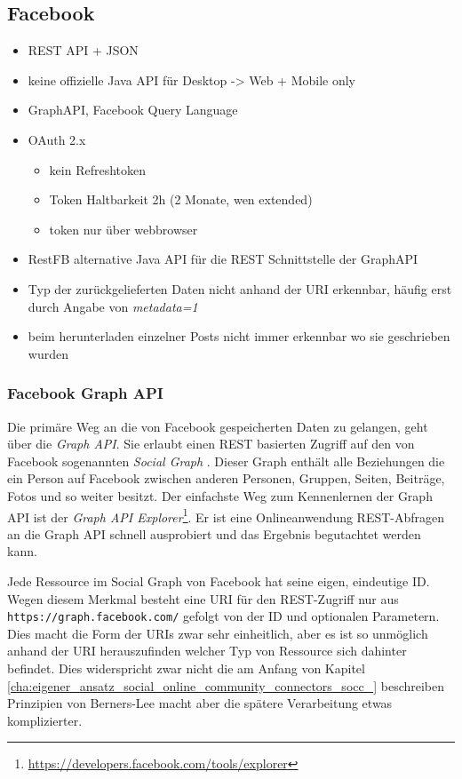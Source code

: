 
\subsection{Facebook} %
\label{sub:facebook_connector}

\begin{itemize}
    \item REST API + JSON
    \item keine offizielle Java API für Desktop -> Web + Mobile only
    \item GraphAPI, Facebook Query Language
    \item OAuth 2.x
    \begin{itemize}
        \item kein Refreshtoken
        \item Token Haltbarkeit 2h (2 Monate, wen extended)
        \item token nur über webbrowser
    \end{itemize}
    \item RestFB alternative Java API für die REST Schnittstelle der GraphAPI
    \item Typ der zurückgelieferten Daten nicht anhand der URI erkennbar, häufig erst durch Angabe von \emph{metadata=1}
    \item beim herunterladen einzelner Posts nicht immer erkennbar wo sie geschrieben wurden
\end{itemize}

\subsubsection{Facebook Graph API} %
\label{ssub:facebook_graph_api}

Die primäre Weg an die von Facebook gespeicherten Daten zu gelangen, geht über die \emph{Graph API}. Sie erlaubt einen REST basierten Zugriff auf den von Facebook sogenannten \emph{Social Graph} \cite{FacebookGraphAPI}. Dieser Graph enthält alle Beziehungen die ein Person auf Facebook zwischen anderen Personen, Gruppen, Seiten, Beiträge, Fotos und so weiter besitzt. Der einfachste Weg zum Kennenlernen der Graph API ist der \emph{Graph API Explorer}\footnote{\url{https://developers.facebook.com/tools/explorer}}. Er ist eine Onlineanwendung REST-Abfragen an die Graph API schnell ausprobiert und das Ergebnis begutachtet werden kann.

Jede Ressource im Social Graph von Facebook hat seine eigen, eindeutige ID. Wegen diesem Merkmal besteht eine URI für den REST-Zugriff nur aus \texttt{https://graph.facebook.com/} gefolgt von der ID und optionalen Parametern. Dies macht die Form der URIs zwar sehr einheitlich, aber es ist so unmöglich anhand der URI herauszufinden welcher Typ von Ressource sich dahinter befindet. Dies widerspricht zwar nicht die am Anfang von Kapitel \ref{cha:eigener_ansatz_social_online_community_connectors_socc_} beschreiben Prinzipien von Berners-Lee macht aber die spätere Verarbeitung etwas komplizierter. 

